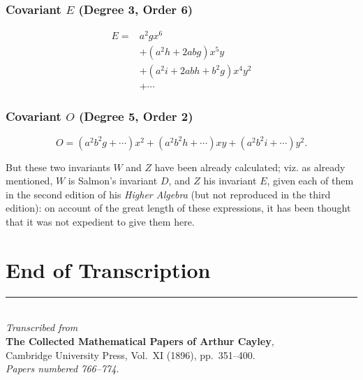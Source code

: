 \documentclass[11pt,a4paper]{article}
\theoremstyle{definition}
\begin{document}
\subsubsection*{Covariant $E$ (Degree 3, Order 6)}

\[
\begin{aligned}
E ={}& a^2gx^6 \\
& + (a^2h + 2abg)x^5y \\
& + (a^2i + 2abh + b^2g)x^4y^2 \\
& + \dotsb
\end{aligned}
\]

\subsubsection*{Covariant $O$ (Degree 5, Order 2)}

\[
O = (a^2b^2g + \dotsb)x^2 + (a^2b^2h + \dotsb)xy + (a^2b^2i + \dotsb)y^2.
\]

But these two invariants $W$ and $Z$ have been already calculated; viz. as already mentioned, $W$ is Salmon's invariant $D$, and $Z$ his invariant $E$, given each of them in the second edition of his \textit{Higher Algebra} (but not reproduced in the third edition): on account of the great length of these expressions, it has been thought that it was not expedient to give them here.

\newpage
\section*{End of Transcription}

\vspace{2cm}
\begin{center}
\rule{0.5\textwidth}{0.4pt}\\[12pt]
\textit{Transcribed from}\\
\textbf{The Collected Mathematical Papers of Arthur Cayley},\\
Cambridge University Press, Vol.~XI (1896), pp.~351--400.\\[6pt]
\textit{Papers numbered 766--774.}
\end{center}
\end{document}
